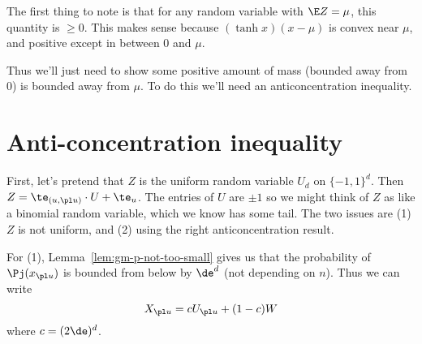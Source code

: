 The first thing to note is that for any random variable with $\E Z=\mu$, this quantity is $\ge 0$. This makes sense because $(\tanh x)(x-\mu)$ is convex near $\mu$, and positive except in between 0 and $\mu$. 

Thus we'll just need to show some positive amount of mass (bounded away from 0) is bounded away from $\mu$. To do this we'll need an anticoncentration inequality.
\section{Anti-concentration inequality}
First, let's pretend that $Z$ is the uniform random variable $U_d$ on $\{-1,1\}^d$. Then $Z=\te_{(u,\pl u)}\cdot U+\te_u$. The entries of $U$ are $\pm 1$ so we might think of $Z$ as like a binomial random variable, which we know has some tail. The two issues are (1) $Z$ is not uniform, and (2) using the right anticoncentration result.

For (1), Lemma~\ref{lem:gm-p-not-too-small} gives us that the probability of $\Pj(x_{\pl u})$ is bounded from below by $\de^d$ (not depending on $n$). Thus we can write
\[
X_{\pl u} = c U_{\pl u}+(1-c)W
\]
where $c=(2\de)^d$.

